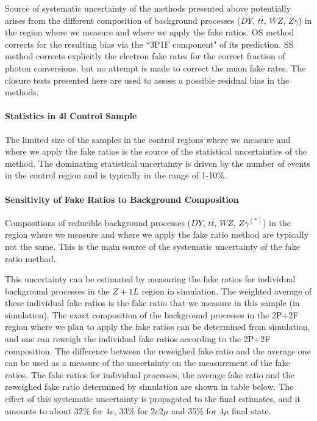 Source of systematic uncertainty of the methods presented above
potentially arises from the different composition of background processes 
($DY$, $t \bar{t}$, $WZ$, $Z\gamma$) in the region where we measure and 
where we apply the fake ratios.
OS method corrects for the resulting bias via the ``3P1F component"
of its prediction. SS method corrects explicitly the electron fake rates
for the correct fraction of photon conversions, but no attempt is made 
to correct the muon fake rates.
The closure tests presented here are used to assess a possible residual
bias in the methods.

\paragraph{Statistics in 4l Control Sample}
The limited size of the samples in the control regions where we measure and where we apply the fake ratios is the source of the statistical uncertainties of the method. The dominating statistical uncertainty is driven by the number of events in the control region and is typically in the range of 1-10\%.

\paragraph{Sensitivity of Fake Ratios to Background Composition}
Compositions of reducible background processes ($DY$, $t \bar{t}$, $WZ$, $Z\gamma^{(*)}$) in the region where we measure and where we apply the fake ratio method are typically not the same. This is the main source of the systematic uncertainty of the fake ratio method.

This uncertainty can be estimated by measuring the fake ratios for individual background processes in the $Z+1L$ region in simulation. The weighted average of these individual fake ratios is the fake ratio that we measure in this sample (in simulation). The exact composition of the background processes in the 2P+2F region where we plan to apply the fake ratios can be determined from simulation, and one can reweigh the individual fake ratios according to the 2P+2F composition. The difference between the reweighed fake ratio and the average one can be used as a measure of the uncertainty on the measurement of the fake ratios. The fake ratios for individual processes, the average fake ratio and the reweighed fake ratio determined by simulation are shown in table below. The effect of this systematic uncertainty is propagated to the final estimates, and it amounts to about 32\% for $4e$, 33\% for $2e2\mu$ and 35\% for $4\mu$ final state. 

